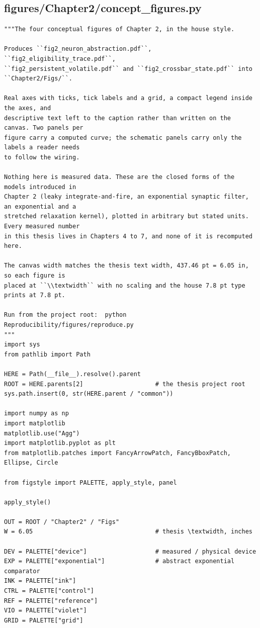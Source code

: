\documentclass[a4paper,10pt]{article}
\begin{document}
\subsection{figures/Chapter2/concept\_figures.py}
\begin{Verbatim}
"""The four conceptual figures of Chapter 2, in the house style.

Produces ``fig2_neuron_abstraction.pdf``, ``fig2_eligibility_trace.pdf``,
``fig2_persistent_volatile.pdf`` and ``fig2_crossbar_state.pdf`` into ``Chapter2/Figs/``.

Real axes with ticks, tick labels and a grid, a compact legend inside the axes, and
descriptive text left to the caption rather than written on the canvas. Two panels per
figure carry a computed curve; the schematic panels carry only the labels a reader needs
to follow the wiring.

Nothing here is measured data. These are the closed forms of the models introduced in
Chapter 2 (leaky integrate-and-fire, an exponential synaptic filter, an exponential and a
stretched relaxation kernel), plotted in arbitrary but stated units. Every measured number
in this thesis lives in Chapters 4 to 7, and none of it is recomputed here.

The canvas width matches the thesis text width, 437.46 pt = 6.05 in, so each figure is
placed at ``\\textwidth`` with no scaling and the house 7.8 pt type prints at 7.8 pt.

Run from the project root:  python Reproducibility/figures/reproduce.py
"""
import sys
from pathlib import Path

HERE = Path(__file__).resolve().parent
ROOT = HERE.parents[2]                    # the thesis project root
sys.path.insert(0, str(HERE.parent / "common"))

import numpy as np
import matplotlib
matplotlib.use("Agg")
import matplotlib.pyplot as plt
from matplotlib.patches import FancyArrowPatch, FancyBboxPatch, Ellipse, Circle

from figstyle import PALETTE, apply_style, panel

apply_style()

OUT = ROOT / "Chapter2" / "Figs"
W = 6.05                                  # thesis \textwidth, inches

DEV = PALETTE["device"]                   # measured / physical device
EXP = PALETTE["exponential"]              # abstract exponential comparator
INK = PALETTE["ink"]
CTRL = PALETTE["control"]
REF = PALETTE["reference"]
VIO = PALETTE["violet"]
GRID = PALETTE["grid"]



\end{Verbatim}
\end{document}
